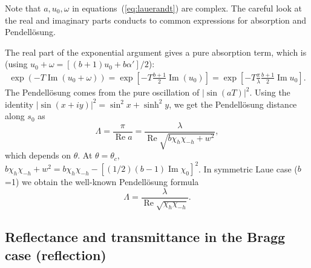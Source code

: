\documentclass[preprint]{iucr}              %
\newcommand{\inblue}[1]{{\color{blue}#1}}
\begin{document}
\inblue{
Note that $a, u_0, \omega$ in equations~(\ref{eq:lauerandt}) are complex. The careful look at the real and imaginary parts conducts to common expressions for absorption and Pendell\"osung. 

The real part of the exponential argument gives a pure absorption term, which is (using $u_0+\omega=[(b+1)u_0+b\alpha']/2$):  
\begin{subequations}
\begin{align}
    \exp(-T\operatorname{Im} (u_0+\omega)) = 
    \exp[-T \frac{b+1}{2}\operatorname{Im}(u_0)] =  
    \exp[-T \frac{\pi}{\lambda}\frac{b+1}{2} \operatorname{Im} u_0].
\end{align}
\end{subequations}
The Pendell\"osung comes from the pure oscillation of $|\sin(aT)|^2$. Using the identity $|\sin(x+iy)|^2=\sin^2x + \sinh^2 y$, we get the Pendell\"osung distance along $s_0$ as 
\begin{equation}\label{eq:PendellosungGeneric}
    \Lambda = \frac{\pi}{\operatorname{Re} a}=\frac{\lambda}{\operatorname{Re}\sqrt{b\chi_h\chi_{-h} + w^2}},
\end{equation}
which depends on $\theta$. At $\theta=\theta_c$, $b \chi_h \chi_{-h}+w^2=b \chi_h \chi_{-h} - [(1/2)(b-1)\operatorname{Im}\chi_0]^2$. In symmetric Laue case ($b$=1) we obtain the well-known Pendell\"osung formula
\begin{equation}\label{eq:Pendellosung}
    \Lambda =\frac{\lambda}{\operatorname{Re}\sqrt{\chi_h\chi_{-h}}}.
\end{equation}
}

%
\subsection{Reflectance and transmittance in the Bragg case (reflection)}
\label{sec:TTsolutionsBragg}
\end{document}
